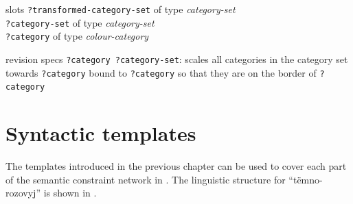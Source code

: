 \begin{explanation}{slots}
  \verb+?transformed-category-set+ of type \emph{category-set} \\
  \verb+?category-set+ of type \emph{category-set} \\
  \verb+?category+ of type \emph{colour-category}
\end{explanation}

\begin{explanation}{revision specs}
  \verb+?category ?category-set+: scales all categories in the category
  set towards \verb+?category+ bound to \verb+?category+ so that they
  are on the border of \verb+?category+
\end{explanation}

\section{Syntactic templates}

The templates introduced in the previous chapter can be used to cover
each part of the semantic constraint network in . The linguistic structure for
``t\"emno-rozovyj'' is shown in .


